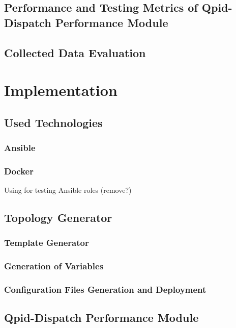 \section{Performance and Testing Metrics of Qpid-Dispatch Performance Module}

\section{Collected Data Evaluation}

\chapter{Implementation}
\label{Implementation}

\section{Used Technologies}

\subsection{Ansible}

\subsection{Docker}
Using for testing Ansible roles (remove?)

\section{Topology Generator}

\subsection{Template Generator}

\subsection{Generation of Variables}

\subsection{Configuration Files Generation and Deployment}

\section{Qpid-Dispatch Performance Module}

